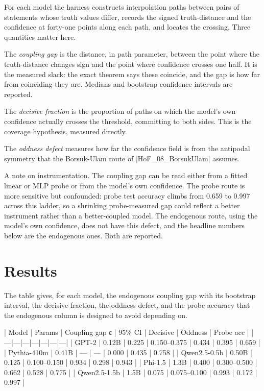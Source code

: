 \documentclass{memoir}
\begin{document}
For each model the harness constructs interpolation paths between pairs of
statements whose truth values differ, records the signed truth-distance and the
confidence at forty-one points along each path, and locates the crossing. Three
quantities matter here.

The \emph{coupling gap} is the distance, in path parameter, between the point where
the truth-distance changes sign and the point where confidence crosses one half.
It is the measured slack: the exact theorem says these coincide, and the gap is
how far from coinciding they are. Medians and bootstrap confidence intervals are
reported.

The \emph{decisive fraction} is the proportion of paths on which the model's own
confidence actually crosses the threshold, committing to both sides. This is the
coverage hypothesis, measured directly.

The \emph{oddness defect} measures how far the confidence field is from the antipodal
symmetry that the Borsuk-Ulam route of \LeanVerb|HoF_08_BorsukUlam| assumes.

A note on instrumentation. The coupling gap can be read either from a fitted
linear or MLP probe or from the model's own confidence. The probe route is more
sensitive but confounded: probe test accuracy climbs from 0.659 to 0.997 across
this ladder, so a shrinking probe-measured gap could reflect a better instrument
rather than a better-coupled model. The endogenous route, using the model's own
confidence, does not have this defect, and the headline numbers below are the
endogenous ones. Both are reported.



\section{Results}\label{Two--Schemas--of--Impossibility-005F-005F-005F--Machine--Checked--Limits--of--Trustworthy--Machine--Learning-005F-005F-005F--and--Why--They--Tighten--with--Capability----Does--the--Constraint--Bind-005F-005F-005F--Measurements--on--Five--Models----Results}

The table gives, for each model, the endogenous coupling gap with its bootstrap
interval, the decisive fraction, the oddness defect, and the probe accuracy that
the endogenous column is designed to avoid depending on.

| Model | Params | Coupling gap ε | 95\% CI | Decisive | Oddness | Probe acc |
|---|---|---|---|---|---|---|
| GPT-2 | 0.12B | 0.225 | 0.150–0.375 | 0.434 | 0.395 | 0.659 |
| Pythia-410m | 0.41B | — | — | 0.000 | 0.435 | 0.758 |
| Qwen2.5-0.5b | 0.50B | 0.125 | 0.100–0.150 | 0.934 | 0.298 | 0.943 |
| Phi-1.5 | 1.3B | 0.400 | 0.300–0.500 | 0.662 | 0.528 | 0.775 |
| Qwen2.5-1.5b | 1.5B | 0.075 | 0.075–0.100 | 0.993 | 0.172 | 0.997 |
\end{document}
